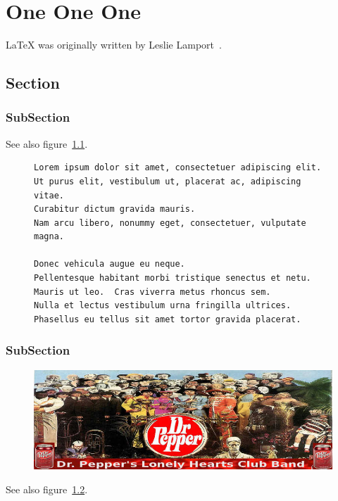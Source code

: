 

\chapter{One One One}
\LaTeX{} was originally written by Leslie Lamport~\citep{lamport94}.
\gaudeamus
\section{Section}
\lipsum[1]
\subsection{SubSection}
\lipsum[1]
See also figure~\ref{document}.
\begin{figure}[h]
\begin{verbatim}
Lorem ipsum dolor sit amet, consectetuer adipiscing elit.
Ut purus elit, vestibulum ut, placerat ac, adipiscing vitae.
Curabitur dictum gravida mauris.
Nam arcu libero, nonummy eget, consectetuer, vulputate magna.

Donec vehicula augue eu neque.
Pellentesque habitant morbi tristique senectus et netu.
Mauris ut leo.  Cras viverra metus rhoncus sem.
Nulla et lectus vestibulum urna fringilla ultrices.
Phasellus eu tellus sit amet tortor gravida placerat.
\end{verbatim}
\caption[FIG LIST AAAAA]{\gaudeamus}\label{document}
\end{figure}
\subsection{SubSection}
\lipsum[1]
\begin{figure}[h]
\begin{center}
\vspace*{15pt}
\includegraphics[scale=0.51]{book.jpg}
\end{center}
\caption[FIG LIST BBBBB]{\gaudeamus}\label{fig:figure}
\end{figure}
\lipsum[1]
See also figure~\ref{fig:figure}.
